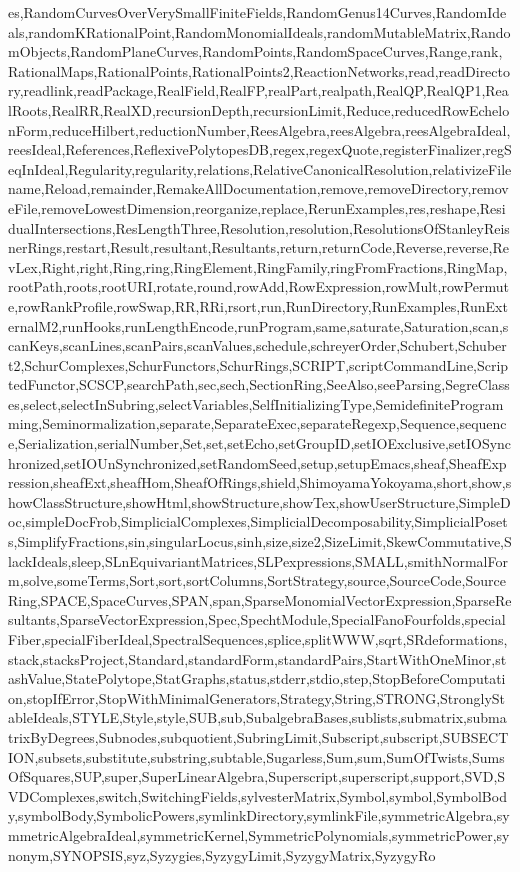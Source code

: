 {es,RandomCurvesOverVerySmallFiniteFields,RandomGenus14Curves,RandomIdeals,randomKRationalPoint,RandomMonomialIdeals,randomMutableMatrix,RandomObjects,RandomPlaneCurves,RandomPoints,RandomSpaceCurves,Range,rank,RationalMaps,RationalPoints,RationalPoints2,ReactionNetworks,read,readDirectory,readlink,readPackage,RealField,RealFP,realPart,realpath,RealQP,RealQP1,RealRoots,RealRR,RealXD,recursionDepth,recursionLimit,Reduce,reducedRowEchelonForm,reduceHilbert,reductionNumber,ReesAlgebra,reesAlgebra,reesAlgebraIdeal,reesIdeal,References,ReflexivePolytopesDB,regex,regexQuote,registerFinalizer,regSeqInIdeal,Regularity,regularity,relations,RelativeCanonicalResolution,relativizeFilename,Reload,remainder,RemakeAllDocumentation,remove,removeDirectory,removeFile,removeLowestDimension,reorganize,replace,RerunExamples,res,reshape,ResidualIntersections,ResLengthThree,Resolution,resolution,ResolutionsOfStanleyReisnerRings,restart,Result,resultant,Resultants,return,returnCode,Reverse,reverse,RevLex,Right,right,Ring,ring,RingElement,RingFamily,ringFromFractions,RingMap,rootPath,roots,rootURI,rotate,round,rowAdd,RowExpression,rowMult,rowPermute,rowRankProfile,rowSwap,RR,RRi,rsort,run,RunDirectory,RunExamples,RunExternalM2,runHooks,runLengthEncode,runProgram,same,saturate,Saturation,scan,scanKeys,scanLines,scanPairs,scanValues,schedule,schreyerOrder,Schubert,Schubert2,SchurComplexes,SchurFunctors,SchurRings,SCRIPT,scriptCommandLine,ScriptedFunctor,SCSCP,searchPath,sec,sech,SectionRing,SeeAlso,seeParsing,SegreClasses,select,selectInSubring,selectVariables,SelfInitializingType,SemidefiniteProgramming,Seminormalization,separate,SeparateExec,separateRegexp,Sequence,sequence,Serialization,serialNumber,Set,set,setEcho,setGroupID,setIOExclusive,setIOSynchronized,setIOUnSynchronized,setRandomSeed,setup,setupEmacs,sheaf,SheafExpression,sheafExt,sheafHom,SheafOfRings,shield,ShimoyamaYokoyama,short,show,showClassStructure,showHtml,showStructure,showTex,showUserStructure,SimpleDoc,simpleDocFrob,SimplicialComplexes,SimplicialDecomposability,SimplicialPosets,SimplifyFractions,sin,singularLocus,sinh,size,size2,SizeLimit,SkewCommutative,SlackIdeals,sleep,SLnEquivariantMatrices,SLPexpressions,SMALL,smithNormalForm,solve,someTerms,Sort,sort,sortColumns,SortStrategy,source,SourceCode,SourceRing,SPACE,SpaceCurves,SPAN,span,SparseMonomialVectorExpression,SparseResultants,SparseVectorExpression,Spec,SpechtModule,SpecialFanoFourfolds,specialFiber,specialFiberIdeal,SpectralSequences,splice,splitWWW,sqrt,SRdeformations,stack,stacksProject,Standard,standardForm,standardPairs,StartWithOneMinor,stashValue,StatePolytope,StatGraphs,status,stderr,stdio,step,StopBeforeComputation,stopIfError,StopWithMinimalGenerators,Strategy,String,STRONG,StronglyStableIdeals,STYLE,Style,style,SUB,sub,SubalgebraBases,sublists,submatrix,submatrixByDegrees,Subnodes,subquotient,SubringLimit,Subscript,subscript,SUBSECTION,subsets,substitute,substring,subtable,Sugarless,Sum,sum,SumOfTwists,SumsOfSquares,SUP,super,SuperLinearAlgebra,Superscript,superscript,support,SVD,SVDComplexes,switch,SwitchingFields,sylvesterMatrix,Symbol,symbol,SymbolBody,symbolBody,SymbolicPowers,symlinkDirectory,symlinkFile,symmetricAlgebra,symmetricAlgebraIdeal,symmetricKernel,SymmetricPolynomials,symmetricPower,synonym,SYNOPSIS,syz,Syzygies,SyzygyLimit,SyzygyMatrix,SyzygyRo}
